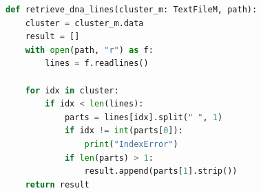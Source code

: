 \begin{lstlisting}[language=Python, caption={Retrieving DNA sequences from a cluster}, label={lst:python-retrieve-dna}]
def retrieve_dna_lines(cluster_m: TextFileM, path):
    cluster = cluster_m.data
    result = []
    with open(path, "r") as f:
        lines = f.readlines()

    for idx in cluster:
        if idx < len(lines):
            parts = lines[idx].split(" ", 1)
            if idx != int(parts[0]):
                print("IndexError")
            if len(parts) > 1:
                result.append(parts[1].strip())
    return result
\end{lstlisting}
